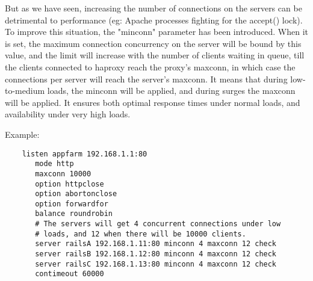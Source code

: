 But as we have seen, increasing the number of connections on the servers can
be detrimental to performance (eg: Apache processes fighting for the accept()
lock). To improve this situation, the "minconn" parameter has been introduced.
When it is set, the maximum connection concurrency on the server will be bound
by this value, and the limit will increase with the number of clients waiting
in queue, till the clients connected to haproxy reach the proxy's maxconn, in
which case the connections per server will reach the server's maxconn. It means
that during low-to-medium loads, the minconn will be applied, and during surges
the maxconn will be applied. It ensures both optimal response times under
normal loads, and availability under very high loads.

Example:

\begin{verbatim}
    listen appfarm 192.168.1.1:80
       mode http
       maxconn 10000
       option httpclose
       option abortonclose
       option forwardfor
       balance roundrobin
       # The servers will get 4 concurrent connections under low
       # loads, and 12 when there will be 10000 clients.
       server railsA 192.168.1.11:80 minconn 4 maxconn 12 check
       server railsB 192.168.1.12:80 minconn 4 maxconn 12 check
       server railsC 192.168.1.13:80 minconn 4 maxconn 12 check
       contimeout 60000
\end{verbatim}
